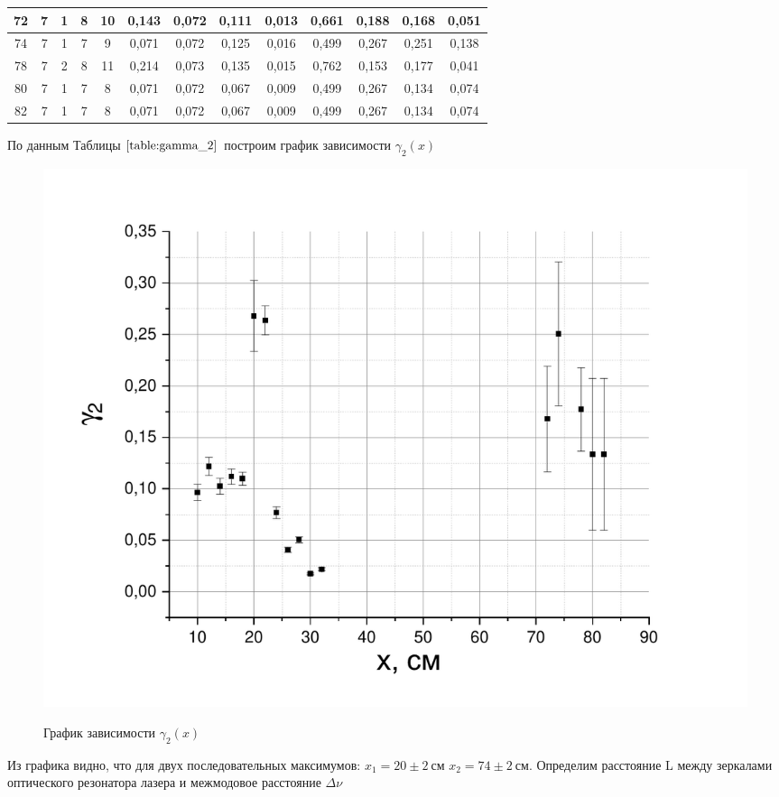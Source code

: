 \documentclass[a4paper,12pt]{article}
\begin{document}
\begin{table}[h!]
\begin{center}
\begin{tabular}{|c|c|c|c|c|c|c|c|c|c|c|c|c|}
72 & 7    & 1    & 8    & 10   & 0,143 & 0,072       & 0,111 & 0,013       & 0,661    & 0,188          & 0,168    & 0,051          \\ \hline
74 & 7    & 1    & 7    & 9    & 0,071 & 0,072       & 0,125 & 0,016       & 0,499    & 0,267          & 0,251    & 0,138          \\ \hline
78 & 7    & 2    & 8    & 11   & 0,214 & 0,073       & 0,135 & 0,015       & 0,762    & 0,153          & 0,177    & 0,041          \\ \hline
80 & 7    & 1    & 7    & 8    & 0,071 & 0,072       & 0,067 & 0,009       & 0,499    & 0,267          & 0,134    & 0,074          \\ \hline
82 & 7    & 1    & 7    & 8    & 0,071 & 0,072       & 0,067 & 0,009       & 0,499    & 0,267          & 0,134    & 0,074          \\ \hline
\end{tabular}
\end{center}
\end{table}

По данным Таблицы $\ref{table:gamma_2}$  построим график зависимости $\gamma_2(x)$

\begin{figure}[h!]
	\begin{center}
	\includegraphics[scale=0.6]{graph2}
	\label{fig:graph2}
	\caption{График зависимости $\gamma_2(x)$}
	\end{center}
\end{figure}

\newpage

Из графика видно, что для двух последовательных максимумов: $x_1 = 20 \pm 2 \ см$ $x_2 = 74 \pm 2 \ см$. Определим расстояние L между зеркалами оптического резонатора лазера и межмодовое расстояние $\Delta \nu$
\end{document}
